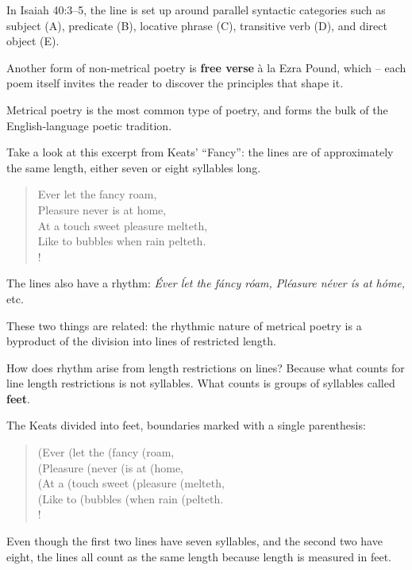 \ex In Isaiah 40:3--5, the line is set up around parallel syntactic categories such as subject (A), predicate (B), locative phrase (C), transitive verb (D), and direct object (E).
\xe

\ex Another form of non-metrical poetry is \textbf{free verse} à la Ezra Pound, which  \autocite[3]{fabb2008meter} – each poem itself invites the reader to discover the principles that shape it. 
\xe

\ex Metrical poetry is the most common type of poetry, and forms the bulk of the English-language poetic tradition.
\xe

\ex Take a look at this excerpt from Keats' \enquote{Fancy}: the lines are of approximately the same length, either seven or eight syllables long.
\xe

\ex \begin{verse}
  Ever let the fancy roam,\\
  Pleasure never is at home,\\
  At a touch sweet pleasure melteth,\\
  Like to bubbles when rain pelteth.\\!
\end{verse}
\xe

\ex The lines also have a rhythm: \textit{Éver ĺet the fáncy róam, Pléasure néver ís at hóme,} etc.
\xe

\ex These two things are related: the rhythmic nature of metrical poetry is a byproduct of the division into lines of restricted length.
\xe

\ex How does rhythm arise from length restrictions on lines? Because what counts for line length restrictions is not syllables. What counts is groups of syllables called \textbf{feet}.
\xe

\ex The Keats divided into feet, boundaries marked with a single parenthesis:
\begin{verse}
  (Ever (let the (fancy (roam,\\
  (Pleasure (never (is at (home,\\
  (At a (touch sweet (pleasure (melteth,\\
  (Like to (bubbles (when rain (pelteth.\\!
\end{verse}
\xe

\ex Even though the first two lines have seven syllables, and the second two have eight, the lines all count as the same length because length is measured in feet.
\xe

